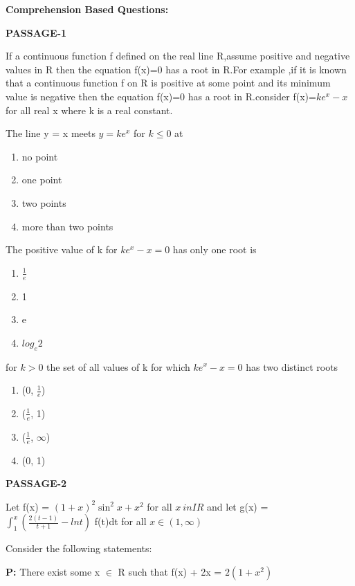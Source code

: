 \clearpage
\twocolumn

\textbf{Comprehension Based Questions:}

\textbf{PASSAGE-1}

If a continuous function f defined on the real line R,assume positive and negative values in R then the equation f(x)=0 has a root in R.For example ,if it is known that a continuous function f on R is positive at some point and its minimum value is negative then the equation f(x)=0 has a root in R.consider f(x)=$ke^x-x$ for all real x where k is a real constant.

\item The line y = x meets $y = ke^x$ for $k \leq 0$ at
\begin{enumerate}
\item no point
\item one point
\item two points
\item more than two points
\end{enumerate}

\item The positive value of k for $ke^x - x = 0$ has only one root is
\begin{enumerate}
\item $\frac{1}{e}$
\item 1
\item e
\item $log_e2$
\end{enumerate}

\item for $k > 0$ the set of all values of k for which $ke^x - x = 0$ has two distinct roots
\begin{enumerate}
\item (0, $\frac{1}{e}$)
\item ($\frac{1}{e}$, 1)
\item ($\frac{1}{e}$, $\infty$)
\item (0, 1)
\end{enumerate}

\textbf{PASSAGE-2}

Let f(x) = $(1 + x)^2 \sin^2 x + x^2$ for all $x\ in IR$ and let g(x) = $\int_{1}^{x} (\frac{2(t - 1)}{t + 1} - lnt)$ f(t)dt for all $x \in (1,\infty)$

\item Consider the following statements:

\textbf{P:} There exist some x $\in$ R such that f(x) + 2x = $2(1 + x^2)$

